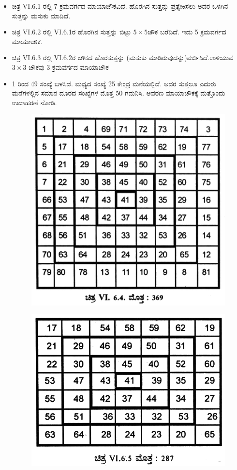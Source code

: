 \begin{itemize}
	\item ಚಿತ್ರ VI.6.1 ರಲ್ಲಿ 7 ಕ್ರಮವರ್ಗದ ಮಾಯಾಚೌಕವಿದೆ. ಹೊರಗಿನ ಸುತ್ತನ್ನು ಪ್ರತ್ಯೇಕಿಸಲು ಅದರ ಒಳಗಿನ ಸುತ್ತನ್ನು ಮಸುಕು ಮಾಡಿದೆ.
	\item ಚಿತ್ರ VI.6.2 ರಲ್ಲಿ VI.6.1ರ ಹೊರಗಿನ ಸುತ್ತನ್ನು ಬಿಟ್ಟು $5 \times 5$ಚೌಕ ಬರೆದಿದೆ. ಇದು 5 ಕ್ರಮವರ್ಗದ ಮಾಯಾಚೌಕ.
	\item ಚಿತ್ರ VI.6.3 ರಲ್ಲಿ VI.6.2ರ ಚೌಕದ ಹೊರಸುತ್ತನ್ನು (ಮಸುಕು ಮಾಡಿರುವುದನ್ನು)ವರ್ಜಿಸಿದೆ.ಉಳಿಯುವ $3 \times 3$ ಚೌಕವು 3 ಕ್ರಮವರ್ಗದ ಮಾಯಾಚೌಕ
	\item 1 ರಿಂದ 49 ಸಂಖ್ಯೆ ಬಳಸಿದೆ. ಮಧ್ಯದ ಸಂಖ್ಯೆ 25 ಕೇಂದ್ರ ಮನೆಯಲ್ಲಿದೆ. ಅದರ ಸುತ್ತಲೂ ಎದುರು ಮನೆಗಳಲ್ಲಿನ ಸಮಾನ ದೂರದ ಸಂಖ್ಯೆಗಳ ಮೊತ್ತ 50 ಗಮನಿಸಿ. ಆವರಣ ಮಾಯಾಚೌಕಕ್ಕೆ ಮತ್ತೊಂದು ಉದಾಹರಣೆ ನೋಡಿ.
	\begin{figure}[H]
	\includegraphics[scale=.8]{src/figures/chap5/fig5-10.jpg}
	\end{figure}
	\begin{figure}[H]
	\includegraphics[scale=.8]{src/figures/chap5/fig5-11.jpg}

\end{figure}
\end{itemize}
